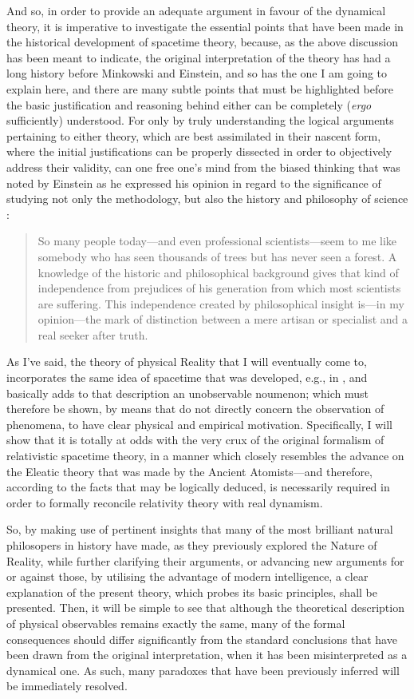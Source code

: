 And so, in order to provide an adequate argument in favour of the dynamical theory, it is imperative to investigate the essential points that have been made in the historical development of spacetime theory, because, as the above discussion has been meant to indicate, the original interpretation of the theory has had a long history before Minkowski and Einstein, and so has the one I am going to explain here, and there are many subtle points that must be highlighted before the basic justification and reasoning behind either can be completely (\textit{ergo} sufficiently) understood. For only by truly understanding the logical arguments pertaining to either theory, which are best assimilated in their nascent form, where the initial justifications can be properly dissected in order to objectively address their validity, can one free one's mind from the biased thinking that was noted by Einstein as he expressed his opinion in regard to the significance of studying not only the methodology, but also the history and philosophy of science \cite{Howard2010}:
\begin{quote}
So many people today---and even professional scientists---seem to me like somebody who has seen thousands of trees but has never seen a forest. A knowledge of the historic and philosophical background gives that kind of independence from prejudices of his generation from which most scientists are suffering. This independence created by philosophical insight is---in my opinion---the mark of distinction between a mere artisan or specialist and a real seeker after truth. 
\end{quote}

As I've said, the theory of physical Reality that I will eventually come to, incorporates the same idea of spacetime that was developed, e.g., in \cite{Geroch1970}, and basically adds to that description an unobservable noumenon; which must therefore be shown, by means that do not directly concern the observation of phenomena, to have clear physical and empirical motivation. Specifically, I will show that it is totally at odds with the very crux of the original formalism of relativistic spacetime theory, in a manner which closely resembles the advance on the Eleatic theory that was made by the Ancient Atomists---and therefore, according to the facts that may be logically deduced, is necessarily required in order to formally reconcile relativity theory with real dynamism. 

So, by making use of pertinent insights that many of the most brilliant natural philosopers in history have made, as they previously explored the Nature of Reality, while further clarifying their arguments, or advancing new arguments for or against those, by utilising the advantage of modern intelligence, a clear explanation of the present theory, which probes its basic principles, shall be presented. Then, it will be simple to see that although the theoretical description of physical observables remains exactly the same, many of the formal consequences should differ significantly from the standard conclusions that have been drawn from the original interpretation, when it has been misinterpreted as a dynamical one. As such, many paradoxes that have been previously inferred will be immediately resolved.

